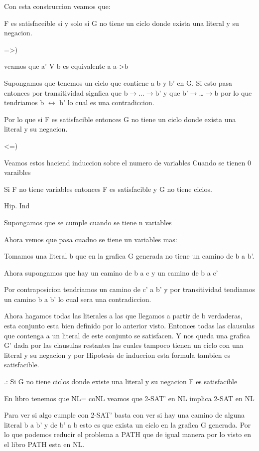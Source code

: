 \documentclass[12pt]{article}
\begin{document}
Con esta construccion veamos que:

	 F es satisfaceible si y solo si G no tiene un ciclo donde exista una literal y su negacion.

=>)

veamos que a’ V b es equivalente a a->b

Supongamos que tenemos un ciclo que contiene a b y b’ en G. 
Si esto pasa entonces por transitividad signfica que b$\rightarrow$...$\rightarrow$b’ y que b’$\rightarrow$…$\rightarrow$b por lo que tendriamos  b $\leftrightarrow$ b’ lo cual es una contradiccion.

Por lo que si F es satisfacible entonces G no tiene un ciclo donde exista una literal y su negacion.

<=)

Veamos estos haciend induccion sobre el numero de variables 
Cuando se tienen 0 varaibles

Si F no tiene variables entonces F es satisfacible y G no tiene ciclos.

Hip. Ind

Supongamos que se cumple cuando se tiene n variables

Ahora vemos que pasa cuadno se tiene un variables mas:

Tomamos una literal b que en la grafica G generada no tiene un camino de b a b’.

Ahora supongamos que hay un camino de b a c y un camino de b a c’

Por contraposicion tendriamos un camino de c’ a b’ y por transitividad tendiamos un camino  b a b’ lo cual sera una contradiccion.

Ahora hagamos todas las literales  a las que llegamos a partir de b verdaderas, esta conjunto esta bien definido por lo anterior visto. Entonces todas las clausulas que contenga a un literal de este conjunto se satisfacen. Y nos queda una grafica G’ dada por las clausulas restantes las cuales tampoco tienen un ciclo con una literal y su negacion y por Hipotesis de induccion esta formula tambien es satisfacible.

.: Si G no tiene ciclos donde existe una literal y su negacion F es satisfacible




En libro tenemos que NL= coNL veamos que 2-SAT’ en NL implica 2-SAT en NL

Para ver si algo cumple con 2-SAT’ basta con ver si hay una camino de alguna literal b a b’ y de b’ a b esto es que exista un ciclo en la grafica G generada. Por lo que podemos reducir el problema a PATH que de igual manera por lo visto en el libro PATH esta en NL.
\end{document}
